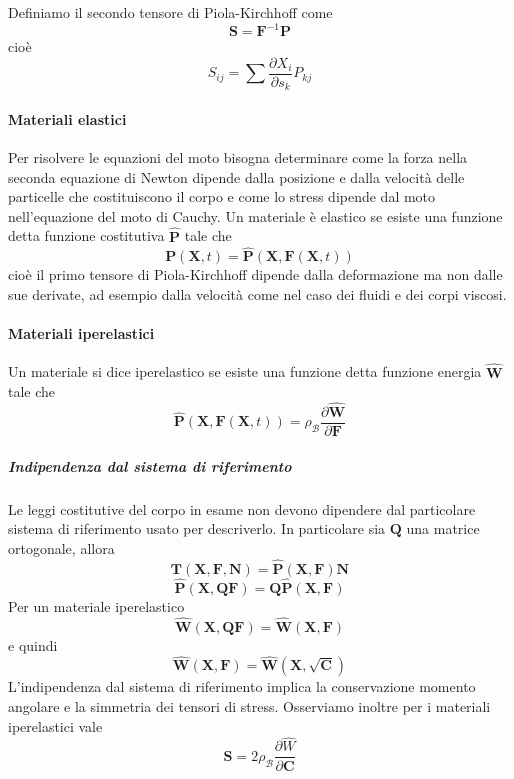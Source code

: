 Definiamo il secondo tensore di Piola-Kirchhoff come
\begin{equation*}
\mathbf{S}=\mathbf{F}^{-1}\mathbf{P}
\end{equation*}
cioè
\begin{equation*}
S_{ij} = \sum \frac{\partial X_i}{\partial s_k}P_{kj}
\end{equation*}


\paragraph{Materiali elastici}
Per risolvere le equazioni del moto bisogna determinare come la forza nella seconda equazione di Newton dipende dalla posizione e dalla velocità delle particelle che costituiscono il corpo e come lo stress dipende dal moto nell'equazione del moto di Cauchy. 
Un materiale è elastico se esiste una funzione detta funzione costitutiva $\widehat{\mathbf{P}}$ tale che
\begin{equation*}
\mathbf{P}(\mathbf{X},t)=\widehat{\mathbf{P}}(\mathbf{X},\mathbf{F}(\mathbf{X},t))
\end{equation*}
cioè il primo tensore di Piola-Kirchhoff dipende dalla deformazione ma non dalle sue derivate, ad esempio dalla velocità come nel caso dei fluidi e dei corpi viscosi.
\paragraph{Materiali iperelastici}
Un materiale si dice iperelastico se esiste una funzione detta funzione energia $\widehat{\mathbf{W}}$ tale che 
\begin{equation*}
\widehat{\mathbf{P}}(\mathbf{X},\mathbf{F}(\mathbf{X},t))=\rho_{\mathcal{B}}\frac{\partial \widehat{\mathbf{W}}}{\partial \mathbf{F}}
\end{equation*}
\subparagraph{\emph{Indipendenza dal sistema di riferimento}}
Le leggi costitutive del corpo in esame non devono dipendere dal particolare sistema di riferimento usato per descriverlo.
In particolare sia $\mathbf{Q}$ una matrice ortogonale, allora 
$$\mathbf{T}(\mathbf{X},\mathbf{F},\mathbf{N}) = \widehat{\mathbf{P}}(\mathbf{X},\mathbf{F})\mathbf{N} $$
$$\widehat{\mathbf{P}}(\mathbf{X},\mathbf{Q}\mathbf{F}) = \mathbf{Q}\widehat{\mathbf{P}}(\mathbf{X},\mathbf{F}) $$
Per un materiale iperelastico 
$$\widehat{\mathbf{W}}(\mathbf{X},\mathbf{Q}\mathbf{F}) = \widehat{\mathbf{W}}(\mathbf{X},\mathbf{F}) $$
e quindi
$$\widehat{\mathbf{W}}(\mathbf{X},\mathbf{F}) = \widehat{\mathbf{W}}(\mathbf{X},\sqrt{\mathbf{C}}) $$
L'indipendenza dal sistema di riferimento implica la conservazione momento angolare e la simmetria dei tensori di stress.
Osserviamo inoltre per i materiali iperelastici vale
\begin{equation*}
\widehat{\mathbf{S}} = 2\rho_{\mathcal{B}}\frac{\partial\widehat{W}}{\partial\mathbf{C}}
\end{equation*}
